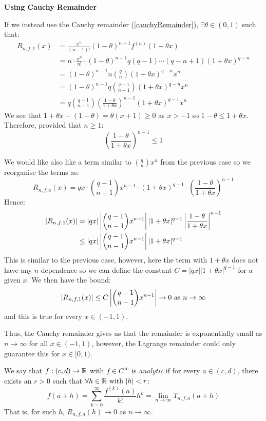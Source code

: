 \documentclass[../main.tex]{subfiles}
\begin{document}
\begin{example}
  \textbf{Using Cauchy Remainder}\par
  If we instead use the Cauchy remainder (\cref{cauchyRemainder}), $\exists \theta \in (0, 1)$ such that:
  \begin{align*}
    R_{n, f, 1}(x) &= \frac{x^{n}}{(n - 1)!}(1 - \theta)^{n - 1}f^{(n)}(1 + \theta x) \\
                   &= n \cdot \frac{x^{n}}{n!} \cdot (1 - \theta)^{n - 1} q(q - 1) \cdots (q - n + 1)(1 + \theta x)^{q - n} \\
                   &= (1 - \theta)^{n - 1}n\binom{q}{n}(1 + \theta x)^{q - n} x^{n} \\
                   &= (1 - \theta)^{n - 1}q \binom{q - 1}{n-1} (1 + \theta x)^{q - n}x^{n} \\
                   &= q \binom{q - 1}{n - 1} \left(\frac{1 - \theta}{1 + \theta x}\right)^{n - 1} (1 + \theta x)^{q - 1} x^{n}
  \end{align*}
  We see that $1 + \theta x - (1 - \theta) = \theta (x + 1) \geq 0$ as $x > -1$ so $1 - \theta \leq 1 + \theta x$.
  Therefore, provided that $n \geq 1$:
  \[
    \left(\frac{1 - \theta}{1 + \theta x}\right)^{n - 1}  \leq 1
  \]

  We would like also like a term similar to $\binom{q}{n}x^{n}$ from the previous case so we reorganise the terms as:
  \[
    R_{n, f, a}(x) = qx \cdot \binom{q - 1}{n - 1}x^{n - 1} \cdot (1 + \theta x)^{q - 1} \cdot \left(\frac{1 - \theta}{1 + \theta x}\right)^{n - 1}
  \]
  Hence:
  \begin{align*}
    |R_{n, f, 1}(x)| &= |qx| \left\lvert \binom{q - 1}{n - 1}x^{n - 1} \right\rvert |1 + \theta x|^{q - 1}\left\lvert \frac{1 - \theta}{1 + \theta x} \right\rvert^{n - 1} \\
                     &\leq |qx| \left\lvert \binom{q - 1}{n - 1} x^{n - 1} \right\rvert|1 + \theta x|^{q - 1}
  \end{align*}
  This is similar to the previous case, however, here the term with $1 + \theta x$ does not have any $n$ dependence so we can define the constant $C = |qx||1 + \theta x|^{q - 1}$ for a given $x$.
  We then have the bound:
  \[
    |R_{n, f, 1}(x)| \leq C \left\lvert \binom{q - 1}{n - 1}x^{n - 1} \right\rvert \to 0 \text{ as $n \to \infty$}
  \]
  and this is true for every $x \in (-1, 1)$.

  Thus, the Cauchy remainder gives us that the remainder is exponentially small as $n \to \infty$ for all $x \in (-1, 1)$, however, the Lagrange remainder could only guarantee this for $x \in [0, 1)$.
\end{example}
\begin{definition}
  We say that $f: (c, d) \to \mathbb{R}$ with $f \in C^{\infty}$ is \textit{analytic} if for every $a \in (c, d)$, there exists an $r > 0$ such that $\forall h \in \mathbb{R} \text{ with } |h| < r$:
  \[
    f(a + h) = \sum_{k = 0}^{\infty} \frac{f^{(k)}(a)}{k!}h^{k} = \lim_{n \to \infty} T_{n, f, a}(a + h)
  \]
  That is, for such $h$, $R_{n, f, a}(h) \to 0$ as $n \to \infty$.
\end{definition}
\end{document}
